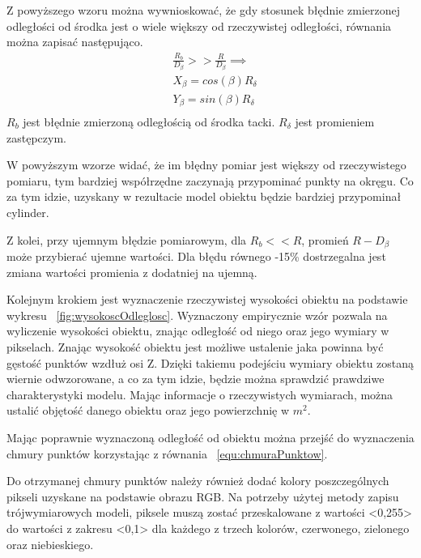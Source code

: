 Z powyższego wzoru można wywnioskować, że gdy stosunek błędnie zmierzonej odległości od środka jest o wiele większy od rzeczywistej odległości, równania można zapisać następująco.
\begin{equation}
    \begin{aligned}
            &\frac{R_{b}}{D_{\beta}}>>\frac{R}{D_{\beta}} \implies\\
            & X_{\beta}=cos(\beta)R_{\delta}  \\
            & Y_{\beta}=sin(\beta)R_{\delta}  \\

    \end{aligned}
\end{equation}
$R_{b}$ jest błędnie zmierzoną odległością od środka tacki. $R_{\delta}$ jest promieniem zastępczym.

W powyższym wzorze widać, że im błędny pomiar jest większy od rzeczywistego pomiaru, tym bardziej współrzędne zaczynają przypominać punkty na okręgu. Co za tym idzie, uzyskany w rezultacie model obiektu będzie bardziej przypominał cylinder.

Z kolei, przy ujemnym błędzie pomiarowym, dla $R_{b}<<R$, promień $R-D_{\beta}$ może przybierać ujemne wartości. Dla błędu równego -15\% dostrzegalna jest zmiana wartości promienia z dodatniej na ujemną. 

Kolejnym krokiem jest wyznaczenie rzeczywistej wysokości obiektu na podstawie wykresu ~\ref{fig:wysokoscOdleglosc}. Wyznaczony empirycznie wzór pozwala na wyliczenie wysokości obiektu, znając odległość od niego oraz jego wymiary w pikselach. Znając wysokość obiektu jest możliwe ustalenie jaka powinna być gęstość punktów wzdłuż osi Z. Dzięki takiemu podejściu wymiary obiektu zostaną wiernie odwzorowane, a co za tym idzie, będzie można sprawdzić prawdziwe charakterystyki modelu. Mając informacje o rzeczywistych wymiarach, można ustalić objętość danego obiektu oraz jego powierzchnię w $m^2$.

Mając poprawnie wyznaczoną odległość od obiektu można przejść do wyznaczenia chmury punktów korzystając z równania ~\ref{equ:chmuraPunktow}. 

Do otrzymanej chmury punktów należy również dodać kolory poszczególnych pikseli uzyskane na podstawie obrazu RGB. Na potrzeby użytej metody zapisu trójwymiarowych modeli, piksele muszą zostać przeskalowane z wartości <0,255> do wartości z zakresu <0,1> dla każdego z trzech kolorów, czerwonego, zielonego oraz niebieskiego.
